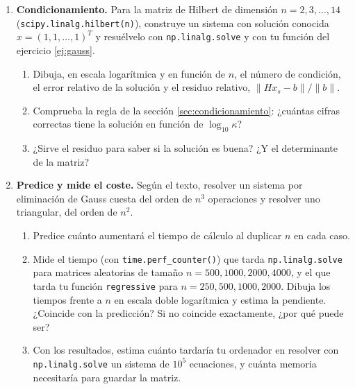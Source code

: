 \begin{enumerate}
\item \label{ej:hilbert} \textbf{Condicionamiento.} Para la matriz de Hilbert de dimensión $n=2, 3, \dots, 14$ (\texttt{scipy.linalg.hilbert(n)}), construye un sistema con solución conocida $x=(1,1,\dots,1)^T$ y resuélvelo con \texttt{np.linalg.solve} y con tu función del ejercicio \ref{ej:gauss}.
\begin{enumerate}
\item Dibuja, en escala logarítmica y en función de $n$, el número de condición, el error relativo de la solución y el residuo relativo, $\lVert H x_s-b\rVert/\lVert b\rVert$.
\item Comprueba la regla de la sección \ref{sec:condicionamiento}: ¿cuántas cifras correctas tiene la solución en función de $\log_{10}\kappa$?
\item ¿Sirve el residuo para saber si la solución es buena? ¿Y el determinante de la matriz?
\end{enumerate}

\item \label{ej:coste} \textbf{Predice y mide el coste.} Según el texto, resolver un sistema por eliminación de Gauss cuesta del orden de $n^3$ operaciones y resolver uno triangular, del orden de $n^2$.
\begin{enumerate}
\item Predice cuánto aumentará el tiempo de cálculo al duplicar $n$ en cada caso.
\item Mide el tiempo (con \texttt{time.perf\_counter()}) que tarda \texttt{np.linalg.solve} para matrices aleatorias de tamaño $n=500, 1000, 2000, 4000$, y el que tarda tu función \texttt{regressive} para $n=250, 500, 1000, 2000$. Dibuja los tiempos frente a $n$ en escala doble logarítmica y estima la pendiente. ¿Coincide con la predicción? Si no coincide exactamente, ¿por qué puede ser?
\item Con los resultados, estima cuánto tardaría tu ordenador en resolver con \texttt{np.linalg.solve} un sistema de $10^5$ ecuaciones, y cuánta memoria necesitaría para guardar la matriz.
\end{enumerate}


\end{enumerate}

